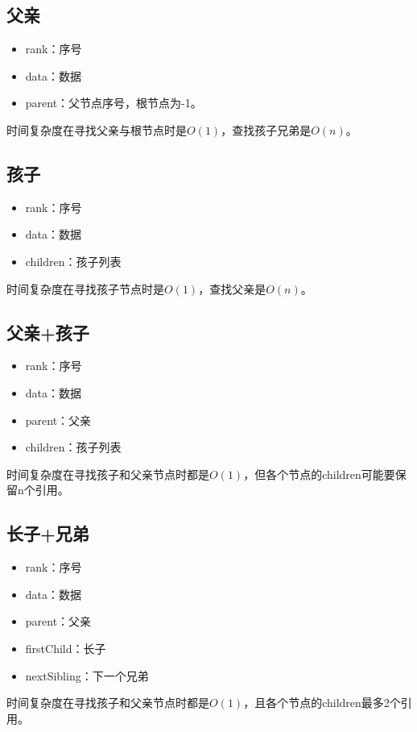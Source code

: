\documentclass{article}
\begin{document}
\subsection{父亲}
\begin{itemize}
  \item rank：序号
  \item data：数据
  \item parent：父节点序号，根节点为-1。
\end{itemize}

时间复杂度在寻找父亲与根节点时是$O(1)$，查找孩子兄弟是$O(n)$。

\subsection{孩子}
\begin{itemize}
  \item rank：序号
  \item data：数据
  \item children：孩子列表
\end{itemize}

时间复杂度在寻找孩子节点时是$O(1)$，查找父亲是$O(n)$。

\subsection{父亲+孩子}
\begin{itemize}
  \item rank：序号
  \item data：数据
  \item parent：父亲
  \item children：孩子列表
\end{itemize}

时间复杂度在寻找孩子和父亲节点时都是$O(1)$，但各个节点的children可能要保留n个引用。

\subsection{长子+兄弟}
\begin{itemize}
  \item rank：序号
  \item data：数据
  \item parent：父亲
  \item firstChild：长子
  \item nextSibling：下一个兄弟
\end{itemize}

时间复杂度在寻找孩子和父亲节点时都是$O(1)$，且各个节点的children最多2个引用。
\end{document}
